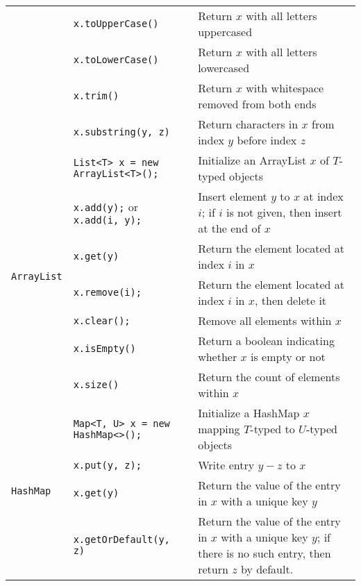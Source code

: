 \documentclass{article}
\begin{document}
\begin{center}
\begin{tabularx}{\textwidth}{llX}
                                         & \lstinline|x.toUpperCase()| & Return \(x\) with all letters uppercased\\
                                         & \lstinline|x.toLowerCase()| & Return \(x\) with all letters lowercased\\
                                         & \lstinline|x.trim()| & Return \(x\) with whitespace removed from both ends\\
                                         & \lstinline|x.substring(y, z)| & Return characters in \(x\) from index \(y\) before index \(z\) \\\midrule
  \multirow{7}{*}[-0.5em]{\lstinline|ArrayList|} & \lstinline|List<T> x = new ArrayList<T>();| & Initialize an ArrayList \(x\) of \(T\)-typed objects\\
                                         & \lstinline|x.add(y);| or \lstinline|x.add(i, y);| & Insert element \(y\) to \(x\) at index \(i\); if \(i\) is not given, then insert at the end of \(x\)\\
                                         & \lstinline|x.get(y)| & Return the element located at index \(i\) in \(x\) \\
                                         & \lstinline|x.remove(i);| & Return the element located at index \(i\) in \(x\), then delete it\\
                                         & \lstinline|x.clear();| & Remove all elements within \(x\)\\
                                         & \lstinline|x.isEmpty()| & Return a boolean indicating whether \(x\) is empty or not\\
                                         & \lstinline|x.size()| & Return the count of elements within \(x\)\\\midrule
  \multirow{8}{*}[-2em]{\lstinline|HashMap|} & \lstinline|Map<T, U> x = new HashMap<>();| & Initialize a HashMap \(x\) mapping \(T\)-typed to \(U\)-typed objects\\
                                       & \lstinline|x.put(y, z);| & Write entry \(y-z\) to \(x\)\\
                                       & \lstinline|x.get(y)| & Return the value of the entry in \(x\) with a unique key \(y\)\\
                                       & \lstinline|x.getOrDefault(y, z)| & Return the value of the entry in \(x\) with a unique key \(y\); if there is no such entry, then return \(z\) by default.\\

\end{tabularx}
\end{center}
\end{document}
